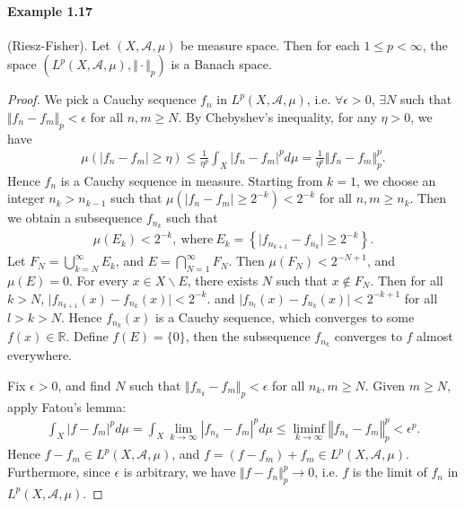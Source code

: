 \documentclass{article}
\begin{document}
\paragraph{Example 1.17} (Riesz-Fisher). Let $(X,\mathscr{A},\mu)$ be measure space. Then for each $1\leq p <\infty$, the space $(L^p(X,\mathscr{A},\mu),\Vert\cdot\Vert_p)$ is a Banach space.
\begin{proof}
We pick a Cauchy sequence $f_n$ in $L^p(X,\mathscr{A},\mu)$, i.e. $\forall \epsilon>0$, $\exists N$ such that $\Vert f_n-f_m\Vert_p <\epsilon$ for all $n,m\geq N$. By Chebyshev's inequality, for any $\eta > 0$, we have
\begin{align*}
	\mu\left(\vert f_n - f_m\vert \geq \eta\right) \leq \frac{1}{\eta^p}\int_X\vert f_n - f_m\vert^p d\mu = \frac{1}{\eta^p}\Vert f_n - f_m\Vert_p^p.
\end{align*}
Hence $f_n$ is a Cauchy sequence in measure. Starting from $k=1$, we choose an integer $n_k > n_{k-1}$ such that $\mu(\vert f_n - f_m\vert \geq 2^{-k}) < 2^{-k}$ for all $n,m\geq n_k$. Then we obtain a subsequence $f_{n_k}$ such that
\begin{align*}
	\mu(E_k) < 2^{-k},\ \text{where}\ E_k = \left\{\vert f_{n_{k+1}} - f_{n_k}\vert \geq 2^{-k}
	\right\}.
\end{align*}
Let $F_N=\bigcup_{k=N}^\infty E_k$, and $E=\bigcap_{N=1}^\infty F_N$. Then $\mu(F_N) < 2^{-N+1}$, and $\mu(E) = 0$. For every $x\in X\backslash E$, there exists $N$ such that $x\notin F_N$. Then for all $k>N$, $\vert f_{n_{k+1}}(x) - f_{n_k}(x)\vert < 2^{-k}$. and $\vert f_{n_l}(x)-f_{n_k}(x)\vert < 2^{-k+1}$ for all $l > k > N$. Hence $f_{n_k}(x)$ is a Cauchy sequence, which converges to some $f(x)\in\mathbb{R}$. Define $f(E)=\{0\}$, then the subsequence $f_{n_k}$ converges to $f$ almost everywhere. 

Fix $\epsilon >0$, and find $N$ such that $\Vert f_{n_k}-f_m\Vert_p < \epsilon$ for all $n_k,m\geq N$. Given $m\geq N$, apply Fatou's lemma:
\begin{align*}
	\int_X\left\vert f - f_m\right\vert^p d\mu = \int_X\lim_{k\to\infty}\left\vert f_{n_k} - f_m\right\vert^p d\mu \leq \liminf_{k\to\infty} \left\Vert f_{n_k} - f_m\right\Vert_p^p < \epsilon^p.\tag{1.7}\label{1.7}
\end{align*}
Hence $f-f_m\in L^p(X,\mathscr{A},\mu)$, and $f=(f-f_m) + f_m\in L^p(X,\mathscr{A},\mu)$. Furthermore, since $\epsilon$ is arbitrary, we have $\Vert f - f_n\Vert_p^p\to 0$, i.e. $f$ is the limit of $f_n$ in $L^p(X,\mathscr{A},\mu)$.
\end{proof}
\end{document}
